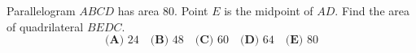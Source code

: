 Parallelogram $ABCD$ has area $80$. Point $E$ is the midpoint of $AD$. Find the area of quadrilateral $BEDC$.
\[\textbf{(A) }24\quad\textbf{(B) }48\quad\textbf{(C) }60\quad\textbf{(D) }64\quad\textbf{(E) }80\]
